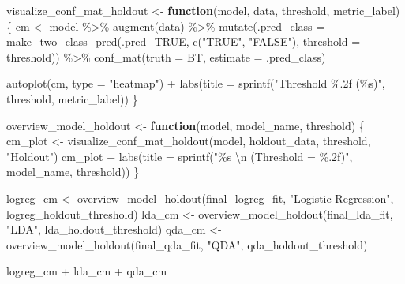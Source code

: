 \documentclass[
]{article}
\newenvironment{Shaded}{\begin{snugshade}}{\end{snugshade}}
\newcommand{\AttributeTok}[1]{\textcolor[rgb]{0.77,0.63,0.00}{#1}}
\newcommand{\ControlFlowTok}[1]{\textcolor[rgb]{0.13,0.29,0.53}{\textbf{#1}}}
\newcommand{\FunctionTok}[1]{\textcolor[rgb]{0.00,0.00,0.00}{#1}}
\newcommand{\NormalTok}[1]{#1}
\newcommand{\OtherTok}[1]{\textcolor[rgb]{0.56,0.35,0.01}{#1}}
\newcommand{\SpecialCharTok}[1]{\textcolor[rgb]{0.00,0.00,0.00}{#1}}
\newcommand{\StringTok}[1]{\textcolor[rgb]{0.31,0.60,0.02}{#1}}
\begin{document}
\begin{Shaded}
\begin{Highlighting}[]
\NormalTok{visualize\_conf\_mat\_holdout }\OtherTok{\textless{}{-}} \ControlFlowTok{function}\NormalTok{(model, data, threshold, metric\_label) \{}
\NormalTok{  cm }\OtherTok{\textless{}{-}}\NormalTok{ model }\SpecialCharTok{\%\textgreater{}\%}
    \FunctionTok{augment}\NormalTok{(data) }\SpecialCharTok{\%\textgreater{}\%}
    \FunctionTok{mutate}\NormalTok{(}\AttributeTok{.pred\_class =} \FunctionTok{make\_two\_class\_pred}\NormalTok{(.pred\_TRUE, }\FunctionTok{c}\NormalTok{(}\StringTok{"TRUE"}\NormalTok{, }\StringTok{"FALSE"}\NormalTok{), }\AttributeTok{threshold =}\NormalTok{ threshold)) }\SpecialCharTok{\%\textgreater{}\%}
    \FunctionTok{conf\_mat}\NormalTok{(}\AttributeTok{truth =}\NormalTok{ BT, }\AttributeTok{estimate =}\NormalTok{ .pred\_class)}
  
  \FunctionTok{autoplot}\NormalTok{(cm, }\AttributeTok{type =} \StringTok{"heatmap"}\NormalTok{) }\SpecialCharTok{+}
    \FunctionTok{labs}\NormalTok{(}\AttributeTok{title =} \FunctionTok{sprintf}\NormalTok{(}\StringTok{"Threshold \%.2f (\%s)"}\NormalTok{, threshold, metric\_label))}
\NormalTok{\}}

\NormalTok{overview\_model\_holdout }\OtherTok{\textless{}{-}} \ControlFlowTok{function}\NormalTok{(model, model\_name, threshold) \{}
\NormalTok{  cm\_plot }\OtherTok{\textless{}{-}} \FunctionTok{visualize\_conf\_mat\_holdout}\NormalTok{(model, holdout\_data, threshold, }\StringTok{"Holdout"}\NormalTok{)}
\NormalTok{  cm\_plot }\SpecialCharTok{+} \FunctionTok{labs}\NormalTok{(}\AttributeTok{title =} \FunctionTok{sprintf}\NormalTok{(}\StringTok{"\%s }\SpecialCharTok{\textbackslash{}n}\StringTok{ (Threshold = \%.2f)"}\NormalTok{, model\_name, threshold))}
\NormalTok{\}}

\NormalTok{logreg\_cm }\OtherTok{\textless{}{-}} \FunctionTok{overview\_model\_holdout}\NormalTok{(final\_logreg\_fit, }\StringTok{"Logistic Regression"}\NormalTok{, logreg\_holdout\_threshold)}
\NormalTok{lda\_cm    }\OtherTok{\textless{}{-}} \FunctionTok{overview\_model\_holdout}\NormalTok{(final\_lda\_fit, }\StringTok{"LDA"}\NormalTok{, lda\_holdout\_threshold)}
\NormalTok{qda\_cm    }\OtherTok{\textless{}{-}} \FunctionTok{overview\_model\_holdout}\NormalTok{(final\_qda\_fit, }\StringTok{"QDA"}\NormalTok{, qda\_holdout\_threshold)}
\end{Highlighting}
\end{Shaded}

\begin{Shaded}
\begin{Highlighting}[]
\NormalTok{logreg\_cm }\SpecialCharTok{+}\NormalTok{ lda\_cm }\SpecialCharTok{+}\NormalTok{ qda\_cm}
\end{Highlighting}
\end{Shaded}
\end{document}
